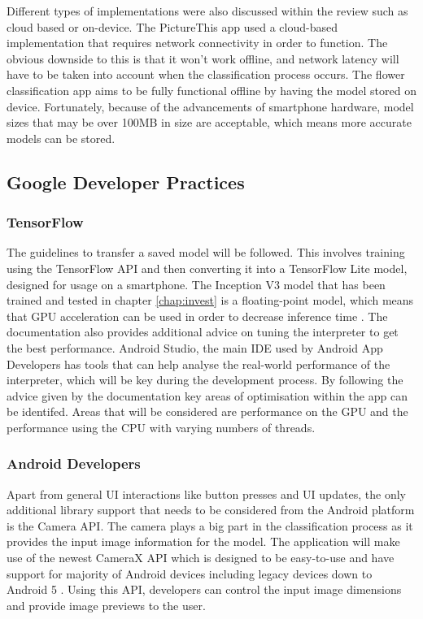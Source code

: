 \documentclass[12pt,a4paper]{report}
\begin{document}
Different types of implementations were also discussed within the review such as cloud based or on-device. 
The PictureThis app used a cloud-based implementation that requires network connectivity in order to function. 
The obvious downside to this is that it won't work offline, and network latency will have to be taken into account when 
the classification process occurs. The flower classification app aims to be fully functional offline by having the model
stored on device. Fortunately, because of the advancements of smartphone hardware, model sizes that may be over 100MB 
in size are acceptable, which means more accurate models can be stored.

\subsection{Google Developer Practices}

\subsubsection{TensorFlow}

The guidelines to transfer a saved model will be followed. This involves training using the TensorFlow API and then
converting it into a TensorFlow Lite model, 
designed for usage on a smartphone. The Inception V3 model that has been trained and tested in chapter \ref{chap:invest}
is a 
floating-point model, which means that GPU acceleration can be used in order to decrease inference time 
\citep{TFGPU}. The documentation also provides additional advice on tuning the interpreter to get the best 
performance. Android Studio, the main IDE used by Android App Developers has tools that can help analyse the 
real-world performance of the interpreter, which will be key during the development process. By following the advice 
given by the documentation key areas of optimisation within the app can be identifed. 
Areas that will be considered are performance on the GPU and the performance using the CPU with varying numbers of threads.

\subsubsection{Android Developers}

Apart from general UI interactions like button presses and UI updates, the only additional library support that needs to 
be considered from the Android platform is the Camera API. The camera plays a big part in the classification process as it 
provides the input image information for the model. The application will make use of the newest CameraX API which is 
designed to be easy-to-use and have support for majority of Android devices including legacy devices down to Android 5 
\citep{ADCameraX}. Using this API, developers can control the input image dimensions and provide image previews to the 
user.
\end{document}
